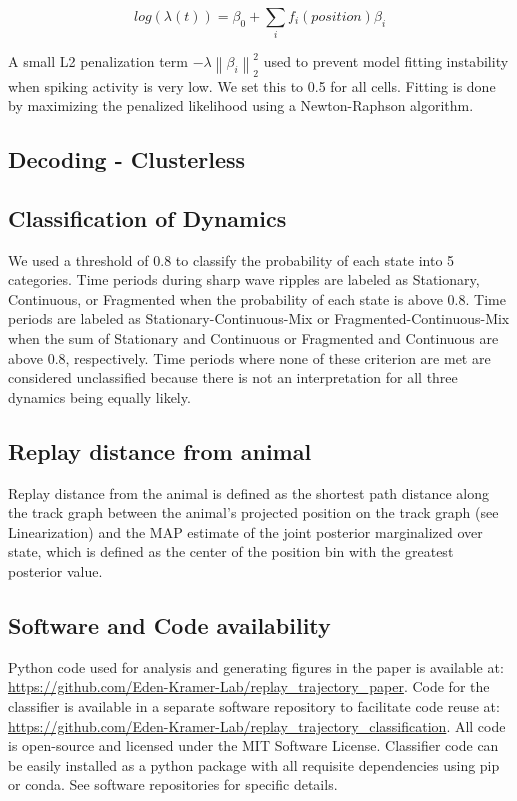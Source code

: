 \documentclass[times, twoside]{zHenriquesLab-StyleBioRxiv}
\newcommand{\norm}[1]{\left\lVert #1 \right\rVert}
\begin{document}
$$log(\lambda(t)) = \beta_{0} + \sum_{i} f_{i}(position)\beta_{i}$$

A small L2 penalization term $-\lambda\norm{\beta_{i}}_{2}^{2}$ used to prevent model fitting instability when spiking activity is very low. We set this to 0.5 for all cells. Fitting is done by maximizing the penalized likelihood using a Newton-Raphson algorithm.

\subsection*{Decoding - Clusterless}

\subsection*{Classification of Dynamics}
We used a threshold of 0.8 to classify the probability of each state into 5 categories. Time periods during sharp wave ripples are labeled as Stationary, Continuous, or Fragmented when the probability of each state is above 0.8. Time periods are labeled as Stationary-Continuous-Mix or Fragmented-Continuous-Mix when the sum of Stationary and Continuous or Fragmented and Continuous are above 0.8, respectively. Time periods where none of these criterion are met are considered unclassified because there is not an interpretation for all three dynamics being equally likely.

\subsection*{Replay distance from animal}
Replay distance from the animal is defined as the shortest path distance along the track graph between the animal's projected position on the track graph (see Linearization) and the MAP estimate of the joint posterior marginalized over state, which is defined as the center of the position bin with the greatest posterior value.

\subsection*{Software and Code availability}
Python code used for analysis and generating figures in the paper is available at: \url{https://github.com/Eden-Kramer-Lab/replay_trajectory_paper}. Code for the classifier is available in a separate software repository to facilitate code reuse at: \url{https://github.com/Eden-Kramer-Lab/replay_trajectory_classification}. All code is open-source and licensed under the MIT Software License. Classifier code can be easily installed as a python package with all requisite dependencies using pip or conda. See software repositories for specific details.
\end{document}
